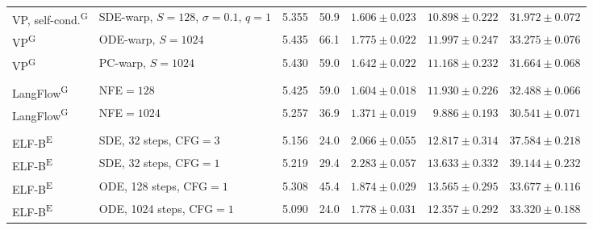 \begin{table}[h]
{\begin{tabular}{@{}llrrrrr@{}}
      VP, self-cond.\textsuperscript{G}
      & SDE-warp, $S=128$, $\sigma=0.1$, $q=1$ & 5.355 & 50.9
      & $1.606 \pm 0.023$
      & $10.898 \pm 0.222$
      & $31.972 \pm 0.072$ \\

      VP\textsuperscript{G}
      & ODE-warp, $S=1024$ & 5.435 & 66.1
      & $1.775 \pm 0.022$
      & $11.997 \pm 0.247$
      & $33.275 \pm 0.076$ \\

      VP\textsuperscript{G}
      & PC-warp, $S=1024$ & 5.430 & 59.0
      & $1.642 \pm 0.022$
      & $11.168 \pm 0.232$
      & $31.664 \pm 0.068$ \\

      \addlinespace[2pt]
      \multicolumn{7}{l}{\textit{LangFlow} \cite{chen2026langflowcontinuousdiffusionrivals}} \\

      LangFlow\textsuperscript{G}
      & NFE$=128$ & 5.425 & 59.0
      & $1.604 \pm 0.018$
      & $11.930 \pm 0.226$
      & $32.488 \pm 0.066$ \\

      LangFlow\textsuperscript{G}
      & NFE$=1024$ & 5.257 & 36.9
      & $1.371 \pm 0.019$
      & $9.886 \pm 0.193$
      & $30.541 \pm 0.071$ \\

    \addlinespace[2pt]
      \rowcolor{gray!10}
      \multicolumn{7}{l}{\textit{ELF} \cite{hu2026elfembeddedlanguageflows}} \\

      \rowcolor{gray!10}
      ELF-B\textsuperscript{E}
      & SDE, 32 steps, CFG$=3$ & 5.156 & 24.0
      & $2.066 \pm 0.055$
      & $12.817 \pm 0.314$
      & $37.584 \pm 0.218$ \\

      \rowcolor{gray!10}
      ELF-B\textsuperscript{E}
      & SDE, 32 steps, CFG$=1$ & 5.219 & 29.4
      & $2.283 \pm 0.057$
      & $13.633 \pm 0.332$
      & $39.144 \pm 0.232$ \\

      \rowcolor{gray!10}
      ELF-B\textsuperscript{E}
      & ODE, 128 steps, CFG$=1$ & 5.308 & 45.4
      & $1.874 \pm 0.029$
      & $13.565 \pm 0.295$
      & $33.677 \pm 0.116$ \\

      \rowcolor{gray!10}
      ELF-B\textsuperscript{E}
      & ODE, 1024 steps, CFG$=1$ & 5.090 & 24.0
      & $1.778 \pm 0.031$
      & $12.357 \pm 0.292$
      & $33.320 \pm 0.188$ \\


\end{tabular}}
\end{table}
